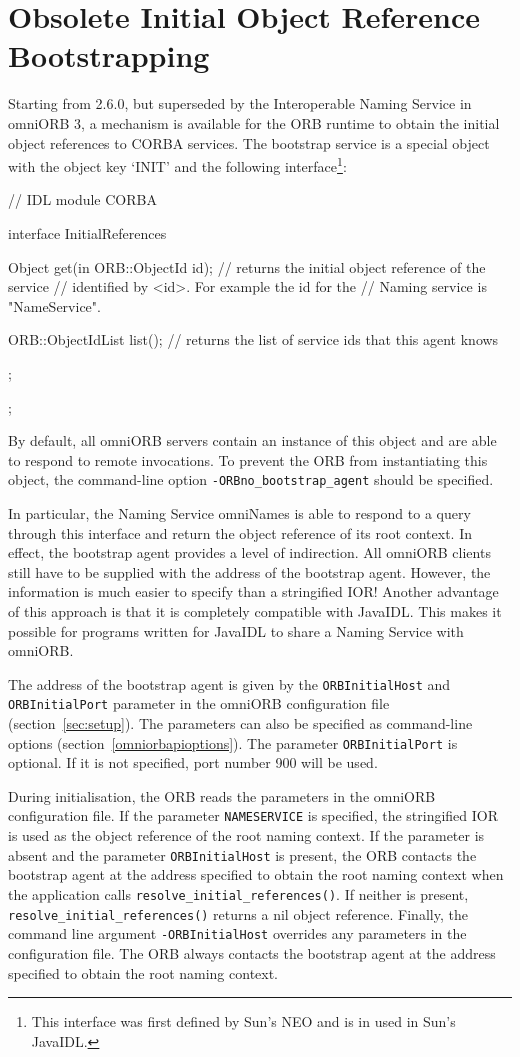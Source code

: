 \documentclass[11pt,twoside,a4paper]{book}
\newcommand{\op}[1]{\texttt{#1()}}
\newcommand{\cmdline}[1]{\texttt{#1}}
\newcommand{\dsc}{\discretionary{}{}{}}
\begin{document}
\section{Obsolete Initial Object Reference Bootstrapping}
\label{sec:bootstrap}

Starting from 2.6.0, but superseded by the Interoperable Naming
Service in omniORB 3, a mechanism is available for the ORB runtime to
obtain the initial object references to CORBA services. The bootstrap
service is a special object with the object key `INIT' and the
following interface\footnote{This interface was first defined by Sun's
NEO and is in used in Sun's JavaIDL.}:

\begin{idllisting}
  // IDL
  module CORBA {
    interface InitialReferences {
      Object get(in ORB::ObjectId id);
      // returns the initial object reference of the service
      // identified by <id>. For example the id for the
      // Naming service is "NameService".

      ORB::ObjectIdList list();
      // returns the list of service ids that this agent knows
   };
 };
\end{idllisting}

By default, all omniORB servers contain an instance of this object and
are able to respond to remote invocations. To prevent the ORB from
instantiating this object, the command-line option
\cmdline{-ORBno\_bootstrap\_agent} should be specified.

In particular, the Naming Service omniNames is able to respond to a
query through this interface and return the object reference of its
root context. In effect, the bootstrap agent provides a level of
indirection.  All omniORB clients still have to be supplied with the
address of the bootstrap agent. However, the information is much
easier to specify than a stringified IOR!  Another advantage of this
approach is that it is completely compatible with JavaIDL. This makes
it possible for programs written for JavaIDL to share a Naming
Service with omniORB.

The address of the bootstrap agent is given by the
\texttt{ORBInitialHost} and \texttt{ORBInitialPort} parameter in the
omniORB configuration file (section~\ref{sec:setup}). The parameters
can also be specified as command-line options
(section~\ref{omniorbapioptions}). The parameter
\texttt{ORBInitialPort} is optional. If it is not specified, port
number 900 will be used.

During initialisation, the ORB reads the parameters in the omniORB
configuration file. If the parameter \texttt{NAMESERVICE} is
specified, the stringified IOR is used as the object reference of the
root naming context. If the parameter is absent and the parameter
\texttt{ORBInitialHost} is present, the ORB contacts the bootstrap
agent at the address specified to obtain the root naming context when
the application calls \op{resolve\_initial\_references}. If neither is
present, \op{resolve\_\dsc{}initial\_references} returns a nil object
reference. Finally, the command line argument
\cmdline{-ORBInitialHost} overrides any parameters in the
configuration file. The ORB always contacts the bootstrap agent at the
address specified to obtain the root naming context.
\end{document}
